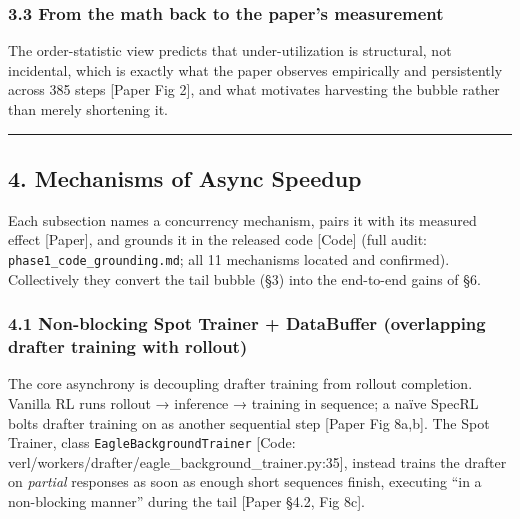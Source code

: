 \documentclass[
  11pt,
  letterpaper,
]{article}
\begin{document}
\subsubsection{3.3 From the math back to the paper's
measurement}\label{from-the-math-back-to-the-papers-measurement}

The order-statistic view predicts that under-utilization is structural,
not incidental, which is exactly what the paper observes empirically and
persistently across 385 steps {[}Paper Fig 2{]}, and what motivates
harvesting the bubble rather than merely shortening it.

\begin{center}\rule{0.5\linewidth}{0.5pt}\end{center}

\subsection{4. Mechanisms of Async
Speedup}\label{mechanisms-of-async-speedup}

Each subsection names a concurrency mechanism, pairs it with its
measured effect {[}Paper{]}, and grounds it in the released code
{[}Code{]} (full audit: \texttt{phase1\_code\_grounding.md}; all 11
mechanisms located and confirmed). Collectively they convert the tail
bubble (§3) into the end-to-end gains of §6.

\subsubsection{4.1 Non-blocking Spot Trainer + DataBuffer (overlapping
drafter training with
rollout)}\label{non-blocking-spot-trainer-databuffer-overlapping-drafter-training-with-rollout}

The core asynchrony is decoupling drafter training from rollout
completion. Vanilla RL runs rollout → inference → training in sequence;
a naïve SpecRL bolts drafter training on as another sequential step
{[}Paper Fig 8a,b{]}. The Spot Trainer, class
\texttt{EagleBackgroundTrainer} {[}Code:
verl/workers/drafter/eagle\_background\_trainer.py:35{]}, instead trains
the drafter on \emph{partial} responses as soon as enough short
sequences finish, executing ``in a non-blocking manner'' during the tail
{[}Paper §4.2, Fig 8c{]}.
\end{document}
